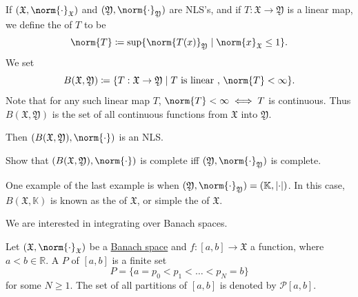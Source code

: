 \documentclass[notoc,notitlepage]{tufte-book}
\begin{document}
\begin{eg}
  If $(\mathfrak{X}, \norm{\cdot}_{\mathfrak{X}})$ and $(\mathfrak{Y},
  \norm{\cdot}_{\mathfrak{Y}})$ are NLS's, and if $T : \mathfrak{X} \to
  \mathfrak{Y}$ is a linear map, we define the  of $T$ to
  be
  \begin{equation*}
    \norm{T} \coloneqq \sup \{ \norm{T(x)}_{\mathfrak{Y}} \mid
    \norm{x}_{\mathfrak{X}} \leq 1 \}.
  \end{equation*}
  We set
  \begin{equation*}
    B(\mathfrak{X}, \mathfrak{Y}) \coloneqq
    \{ T : \mathfrak{X} \to \mathfrak{Y} \mid T \text{ is linear }, \, \norm{T}
    < \infty \}.
  \end{equation*}
  Note that for any such linear map $T$, $\norm{T} < \infty \iff T$ is
  continuous. Thus $B(\mathfrak{X}, \mathfrak{Y})$ is the set of all continuous
  functions from $\mathfrak{X}$ into $\mathfrak{Y}$.

  Then $(B(\mathfrak{X}, \mathfrak{Y}), \norm{\cdot})$ is an NLS.
\end{eg}

\begin{ex}
  Show that $(B(\mathfrak{X}, \mathfrak{Y}), \norm{\cdot})$ is complete iff
  $(\mathfrak{Y}, \norm{\cdot}_{\mathfrak{Y}})$ is complete.
\end{ex}

\begin{note}
  One example of the last example is when $(\mathfrak{Y},
  \norm{\cdot}_{\mathfrak{Y}}) = (\mathbb{K}, \abs{\cdot})$. In this case,
  $B(\mathfrak{X}, \mathbb{K})$ is known as the  of
  $\mathfrak{X}$, or simple the  of $\mathfrak{X}$.
\end{note}

We are interested in integrating over Banach spaces.

\begin{defn}\label{defn:partition}
  Let $(\mathfrak{X}, \norm{\cdot}_{\mathfrak{X}})$ be a
  \hyperref[defn:banach_space]{Banach space} and $f:[a, b] \to \mathfrak{X}$ a
  function, where $a < b \in \mathbb{R}$. A  $P$ of $[a, b]$ 
  is a finite set
  \begin{equation*}
    P = \{ a = p_0 < p_1 < \hdots < p_N = b \}
  \end{equation*}
  for some $N \geq 1$. The set of all partitions of $[a, b]$ is denoted by
  $\mathcal{P}[a, b]$.
\end{defn}
\end{document}
